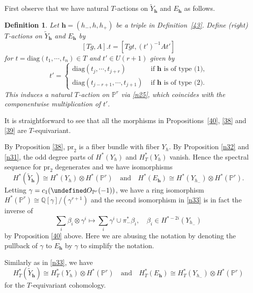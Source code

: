 \documentclass[11pt]{article}
\newtheorem{definition}[theo]{Definition}
\theoremstyle{definition}
\numberwithin{equation}{section}
\let\cal\undefined
\numberwithin{equation}{section}
\newcommand{\PP}{\mathbb{P}}
\newcommand\QQ{\mathbb{Q}}
\newcommand{\cal}{\mathcal}
\newcommand\cO{{\cal O}}
\newcommand\tY{{\widetilde{Y}}}
\newcommand{\aand}{\quad\text{and}\quad}
\newcommand\beq{\begin{equation}}
\newcommand\eeq{\end{equation}}
\newcommand\diag{\mathrm{diag}}
\newcommand\pr{\mathrm{pr}}
\newcommand\bh{\mathbf{h}}
\begin{document}
First observe that we have natural $T$-actions on $\tY_\bh$ and $E_\bh$ as follows. 
\begin{definition}
	Let $\bh=(h_-,h,h_+)$ be a triple in Definition~\ref{43}. 
	Define (right) $T$-actions on $\tY_\bh$ and $E_\bh$ by  
	\beq \label{45} [Tg,A].t=[Tgt,(t')^{-1}At']\eeq
	for $t=\diag(t_1,\cdots, t_n)\in T$ and $t'\in U(r+1)$ given by
	\[t'=\begin{cases}
		\diag(t_j,\cdots, t_{j+r}) &\text{ if $\bh$ is of type (1),}\\
		\diag(t_{j-r+1},\cdots, t_{j+1})  &\text{ if $\bh$ is of type (2).}
	\end{cases}\]
	This induces a natural $T$-action on $\PP^r$ via \eqref{n25}, 
	which coincides with
	the componentwise multiplication of $t'$.
\end{definition}
 It is straightforward to see that all the morphisms in Propositions~\ref{40}, \ref{38} and \ref{39} are $T$-equivariant.

By Proposition \ref{38}, $\pr_2$ is a fiber bundle with fiber $Y_h$. 
By Proposition \ref{n32} and \eqref{n31}, the odd degree parts of $H^*(Y_h)$ and $H^*_T(Y_h)$ vanish. Hence the spectral sequence for $\pr_2$ degenerates and we have isomorphisms 
\beq\label{n33}
H^*(\tY_\bh)\cong H^*(Y_{h})\otimes H^*(\PP^r) \aand H^*(E_\bh)\cong H^*(Y_{h_-})\otimes H^*(\PP^r).
\eeq
Letting $\gamma=c_1(\cO_{\PP^r}(-1))$, we have a ring isomorphism
$H^*(\PP^r)\cong \QQ[\gamma]/(\gamma^{r+1})$ and the second isomorphism in \eqref{n33} is in fact the inverse of 
\beq\label{r3} \sum_i\beta_i\otimes \gamma^i\mapsto 
\sum_i\gamma^i\cup \pi_-^*\beta_i,  
 \quad \beta_i\in H^{*-2i}(Y_{h_-})\eeq 
by Proposition \ref{40} above.  Here we are abusing the notation by denoting the pullback of $\gamma$ to $E_\bh$ by $\gamma$ to simplify the notation.

Similarly as in \eqref{n33}, we have
\beq\label{n34}
H^*_T(\tY_\bh)\cong H^*_T(Y_{h})\otimes H^*(\PP^r) \aand H^*_T(E_\bh)\cong H^*_T(Y_{h_-})\otimes H^*(\PP^r)
\eeq
for the $T$-equivariant cohomology. 
\end{document}
